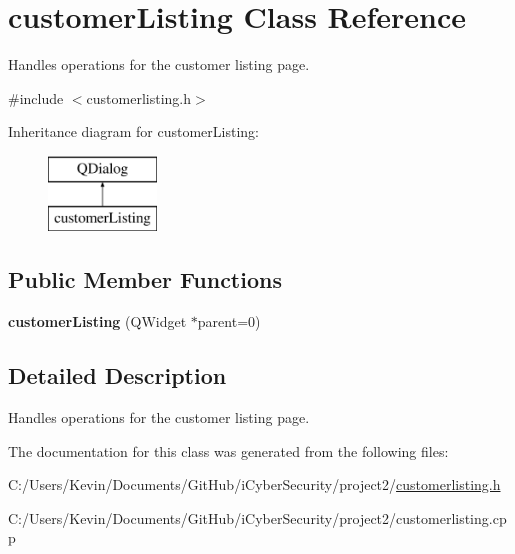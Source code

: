 \hypertarget{classcustomer_listing}{}\section{customer\+Listing Class Reference}
\label{classcustomer_listing}


Handles operations for the customer listing page.  




{\ttfamily \#include $<$customerlisting.\+h$>$}

Inheritance diagram for customer\+Listing\+:\begin{figure}[H]
\begin{center}
\leavevmode
\includegraphics[height=2.000000cm]{classcustomer_listing}
\end{center}
\end{figure}
\subsection*{Public Member Functions}
\begin{DoxyCompactItemize}
\item 
\mbox{\label{classcustomer_listing_a0628a9c6898cb9ddd4130ccca331b74a}} 
{\bfseries customer\+Listing} (Q\+Widget $\ast$parent=0)
\end{DoxyCompactItemize}


\subsection{Detailed Description}
Handles operations for the customer listing page. 

The documentation for this class was generated from the following files\+:\begin{DoxyCompactItemize}
\item 
C\+:/\+Users/\+Kevin/\+Documents/\+Git\+Hub/i\+Cyber\+Security/project2/\mbox{\hyperlink{customerlisting_8h}{customerlisting.\+h}}\item 
C\+:/\+Users/\+Kevin/\+Documents/\+Git\+Hub/i\+Cyber\+Security/project2/customerlisting.\+cpp\end{DoxyCompactItemize}
